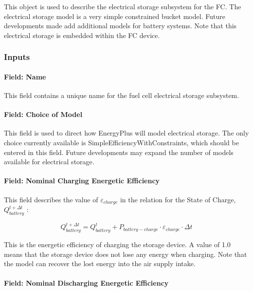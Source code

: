 This object is used to describe the electrical storage subsystem for the FC. The electrical storage model is a very simple constrained bucket model. Future developments made add additional models for battery systems. Note that this electrical storage is embedded within the FC device.

\subsubsection{Inputs}\label{inputs-17-000}

\paragraph{Field: Name}\label{field-name-20}

This field contains a unique name for the fuel cell electrical storage subsystem.

\paragraph{Field: Choice of Model}\label{field-choice-of-model}

This field is used to direct how EnergyPlus will model electrical storage. The only choice currently available is SimpleEfficiencyWithConstraints, which should be entered in this field. Future developments may expand the number of models available for electrical storage.

\paragraph{Field: Nominal Charging Energetic Efficiency}\label{field-nominal-charging-energetic-efficiency}

This field describes the value of \({\varepsilon_{charge}}\) in the relation for the State of Charge, \(Q_{battery}^{t + \Delta t}\) :

\begin{equation}
Q_{battery}^{t + \Delta t} = Q_{battery}^t + {P_{battery - charge}} \cdot {\varepsilon_{charge}} \cdot \Delta t
\end{equation}

This is the energetic efficiency of charging the storage device. A value of 1.0 means that the storage device does not lose any energy when charging. Note that the model can recover the lost energy into the air supply intake.

\paragraph{Field: Nominal Discharging Energetic Efficiency}\label{field-nominal-discharging-energetic-efficiency-1}

